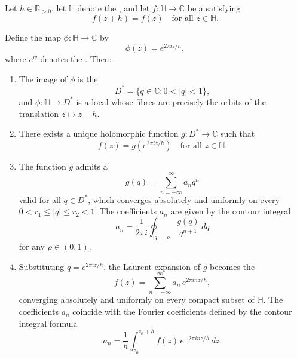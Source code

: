 \begin{theorem}
\label{theorem:periodic_holomorphic_function_on_upper_half_plane_descends_to_punctured_disk_and_has_fourier_laurent_expansion}
Let $h \in \mathbb{R}_{>0}$, let $\mathbb{H}$ denote the , and let $f : \mathbb{H} \to \mathbb{C}$ be a  satisfying
$$f(z + h) = f(z) \quad \text{for all } z \in \mathbb{H}.$$

Define the map $\phi : \mathbb{H} \to \mathbb{C}$ by
$$\phi(z) = e^{2\pi i z / h},$$
where $e^w$ denotes the . Then:

\begin{enumerate}
  \item The image of $\phi$ is the 
  $$D^* = \{q \in \mathbb{C} : 0 < |q| < 1\},$$
  and $\phi : \mathbb{H} \to D^*$ is a local  whose fibres are precisely the orbits of the translation $z \mapsto z + h$.

  \item There exists a unique holomorphic function $g : D^* \to \mathbb{C}$ such that
  $$f(z) = g(e^{2\pi i z / h}) \quad \text{for all } z \in \mathbb{H}.$$

  \item The function $g$ admits a 
  $$g(q) = \sum_{n=-\infty}^{\infty} a_n q^n$$
  valid for all $q \in D^*$, which converges absolutely and uniformly on every  $0 < r_1 \leq |q| \leq r_2 < 1$. The coefficients $a_n$ are given by the contour integral
  $$a_n = \frac{1}{2\pi i} \oint_{|q| = \rho} \frac{g(q)}{q^{n+1}} \, dq$$
  for any $\rho \in (0, 1)$.

  \item Substituting $q = e^{2\pi i z / h}$, the Laurent expansion of $g$ becomes the 
  $$f(z) = \sum_{n=-\infty}^{\infty} a_n \, e^{2\pi i n z / h},$$
  converging absolutely and uniformly on every compact subset of $\mathbb{H}$. The coefficients $a_n$ coincide with the Fourier coefficients defined by the contour integral formula
  $$a_n = \frac{1}{h} \int_{z_0}^{z_0 + h} f(z) \, e^{-2\pi i n z / h} \, dz.$$
\end{enumerate}
\end{theorem}

